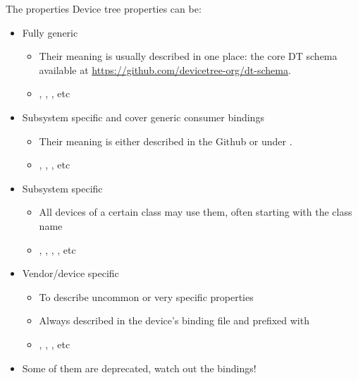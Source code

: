 \begin{frame}[fragile]{The properties}
  Device tree properties can be:
  \begin{itemize}
  \item Fully generic
    \begin{itemize}
    \item Their meaning is usually described in one place: the core DT
      schema available at \url{https://github.com/devicetree-org/dt-schema}.
    \item {}, ,
      {}, etc
    \end{itemize}
  \item Subsystem specific and cover generic consumer bindings
    \begin{itemize}
    \item Their meaning is either described in the 
      Github or under .
    \item {}, , , etc
    \end{itemize}
  \item Subsystem specific
    \begin{itemize}
    \item All devices of a certain class may use them, often starting
      with the class name
    \item {}, , ,
      , etc
    \end{itemize}
  \item Vendor/device specific
    \begin{itemize}
    \item To describe uncommon or very specific properties
    \item Always described in the device's binding file and prefixed with 
    \item {}, , , etc
    \end{itemize}
  \item Some of them are deprecated, watch out the bindings!
  \end{itemize}
\end{frame}

